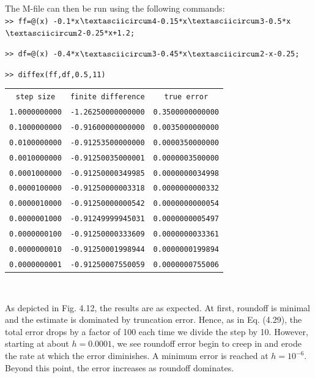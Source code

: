 \documentclass[../main.tex]{subfiles}
\begin{document}
\begin{example}
    \newpage
    \noindent
    The M-file can then be run using the following commands:\\
  
    \texttt{\noindent >> ff=@(x) -0.1*x$\textasciicircum$4-0.15*x$\textasciicircum$3-0.5*x$\textasciicircum$2-0.25*x+1.2;}
  
    \texttt{\noindent >> df=@(x) -0.4*x$\textasciicircum$3-0.45*x$\textasciicircum$2-x-0.25;}
  
    \texttt{\noindent >> diffex(ff,df,0.5,11)}\\
    

\begin{tabular}{c c c}
    \texttt{step size} & \texttt{finite difference} & \texttt{true error}\\
    \texttt{1.0000000000} & \texttt{-1.26250000000000} & \texttt{0.3500000000000}\\
    \texttt{0.1000000000} & \texttt{-0.91600000000000} & \texttt{0.0035000000000}\\
    \texttt{0.0100000000} & \texttt{-0.91253500000000} & \texttt{0.0000350000000}\\
    \texttt{0.0010000000} & \texttt{-0.91250035000001} & \texttt{0.0000003500000}\\
    \texttt{0.0001000000} & \texttt{-0.91250000349985} & \texttt{0.0000000034998}\\
    \texttt{0.0000100000} & \texttt{-0.91250000003318} & \texttt{0.0000000000332}\\
    \texttt{0.0000010000} & \texttt{-0.91250000000542} & \texttt{0.0000000000054}\\
    \texttt{0.0000001000} & \texttt{-0.91249999945031} & \texttt{0.0000000005497}\\
    \texttt{0.0000000100} & \texttt{-0.91250000333609} & \texttt{0.0000000033361}\\
    \texttt{0.0000000010} & \texttt{-0.91250001998944} & \texttt{0.0000000199894}\\
    \texttt{0.0000000001} & \texttt{-0.91250007550059} & \texttt{0.0000000755006}
\end{tabular}\\
\bigskip

    As depicted in Fig. 4.12, the results are as expected. At first, roundoff is minimal and the
    estimate is dominated by truncation error. Hence, as in Eq. (4.29), the total error drops by a factor
    of 100 each time we divide the step by 10. However, starting at about $h = 0.0001$, we see
    roundoff error begin to creep in and erode the rate at which the error diminishes. A minimum
    error is reached at $h = 10^{-6}$. Beyond this point, the error increases as roundoff dominates.
    

\end{example}
\end{document}
